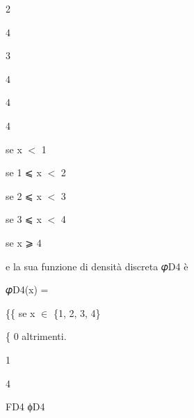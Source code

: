 \documentclass[a4paper,portrait,12pt]{article}
\begin{document}
2





4





3





4


4


4





\begin{flushleft}
se x $<$ 1
\end{flushleft}


\begin{flushleft}
se 1 ⩽ x $<$ 2
\end{flushleft}


\begin{flushleft}
se 2 ⩽ x $<$ 3
\end{flushleft}


\begin{flushleft}
se 3 ⩽ x $<$ 4
\end{flushleft}


\begin{flushleft}
se x ⩾ 4
\end{flushleft}





\begin{flushleft}
e la sua funzione di densit\`{a} discreta 𝜑D4 \`{e}
\end{flushleft}


\begin{flushleft}
𝜑D4(x) =
\end{flushleft}





\begin{flushleft}
\{\{ se x $\in$ \{1, 2, 3, 4\}
\end{flushleft}


\begin{flushleft}
\{ 0 altrimenti.
\end{flushleft}


1


4





\begin{flushleft}
FD4 ϕD4
\end{flushleft}
\end{document}
